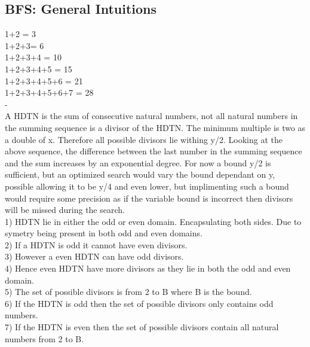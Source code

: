 \documentclass{article}
\begin{document}
\subsection{BFS: General Intuitions}
1+2 = 3\\
1+2+3= 6\\
1+2+3+4 = 10\\
1+2+3+4+5 = 15\\
1+2+3+4+5+6 = 21\\
1+2+3+4+5+6+7 = 28\\
{\color{white}-}\\
A HDTN is the sum of consecutive natural numbers, not all natural numbers in the summing sequence is a
divisor of the HDTN. The minimum multiple is two as a double of x. Therefore all possible divisors lie
withing y/2. Looking at the above sequence, the difference between the last number in the summing sequence
and the sum increases by an exponential degree. For now a bound y/2 is sufficient, but an optimized search
would vary the bound dependant on y, possible allowing it to be y/4 and even lower, but implimenting such a
bound would require some precision as if the variable bound is incorrect then divisors will be missed during
the search.\\
1) HDTN lie in either the odd or even domain. Encapsulating both sides. Due to symetry being present in
both odd and even domains.\\
2) If a HDTN is odd it cannot have even divisors.\\
3) However a even HDTN can have odd divisors.\\
4) Hence even HDTN have more divisors as they lie in both the odd and even domain.\\
5) The set of possible divisors is from 2 to B where B is the bound.\\
6) If the HDTN is odd then the set of possible divisors only contains odd numbers.\\
7) If the HDTN is even then the set of possible divisors contain all natural numbers from 2 to B.
\end{document}
